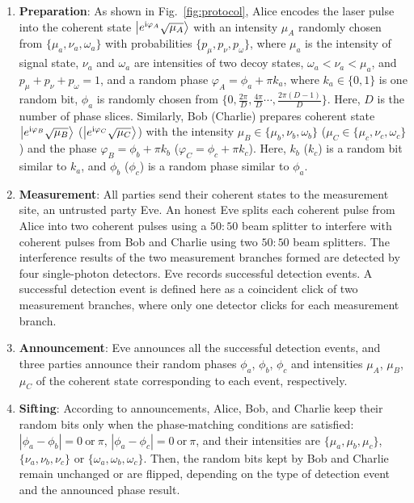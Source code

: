 \documentclass[aps,twocolumn,superscriptaddress,showpacs,nofootinbib]{revtex4-2}
\renewcommand{\i}{\mathrm{i}}
\begin{document}
\begin{enumerate}
	\item[Step.1] \textbf{Preparation}: As shown in Fig.~\ref{fig:protocol}, Alice encodes the laser pulse into the coherent state $\ket{e^{\i\varphi_A}\sqrt{\mu_A}}$ with an intensity $\mu_A$ randomly chosen from $\{ \mu_a , \nu_a ,\omega_a \}$ with probabilities $\{ p_\mu, p_\nu, p_\omega\}$, where $\mu_a$ is the intensity of signal state, $\nu_a$ and $\omega_a$ are intensities of two decoy states, $\omega_a<\nu_a<\mu_a$,  and $p_\mu+ p_\nu+p_\omega=1$, and a random phase $\varphi_A=\phi_{a}+\pi k_{a}$, where $k_{a}\in\{0,1\}$ is one random bit, $\phi_a$ is randomly chosen from $ \{ 0,\frac{2\pi}{D},\frac{4\pi}{D}\cdots,\frac{2\pi(D-1)}{D} \}$. Here, $D$ is the number of phase slices. Similarly, Bob (Charlie) prepares coherent state $\ket{e^{\i\varphi_B}\sqrt{\mu_B}}$ ($\ket{e^{\i\varphi_C}\sqrt{\mu_C}}$) with the intensity $\mu_B \in \{\mu_b,\nu_b,\omega_b\}$ ($\mu_C\in \{\mu_c,\nu_c,\omega_c\}$) and the phase $\varphi_B=\phi_b+\pi k_b$ ($\varphi_C=\phi_c+\pi k_c$). Here, $k_b$ ($k_c$) is a random bit similar to $k_a$, and $\phi_b$ ($\phi_c$) is a random phase similar to  $\phi_a$.


	\item[Step.2] \textbf{Measurement}:  All parties send their coherent states to the measurement site, an untrusted party Eve. An honest Eve splits each coherent pulse from Alice into two coherent pulses using a $50:50$ beam splitter to interfere with coherent pulses from Bob and Charlie using two $50:50$ beam splitters. The interference results  of the two measurement branches formed are detected by four single-photon detectors. Eve records successful detection events. A successful detection event is defined here as a coincident click of two measurement branches, where only one detector clicks for each measurement branch.

	\item[Step.3] \textbf{Announcement}: Eve announces all the successful detection events, and three parties announce their random phases $\phi_a$, $\phi_b$, $\phi_c$ and intensities $\mu_A$, $\mu_B$, $\mu_C$  of the coherent state corresponding to each event, respectively.

	\item[Step.4] \textbf{Sifting}: According to announcements, Alice, Bob, and Charlie keep their random bits only when the phase-matching conditions are satisfied: $|\phi_a-\phi_b|=0~\text{or}~\pi$, $|\phi_a-\phi_c|=0~\text{or}~\pi$, and their intensities are $\{ \mu_a,\mu_b,\mu_c \}$, $ \{ \nu_a,\nu_b,\nu_c \}$ or $\{ \omega_a,\omega_b,\omega_c \}$. Then, the random bits kept by Bob and Charlie remain unchanged or are flipped, depending on the type of detection event and the announced phase result.


\end{enumerate}
\end{document}
